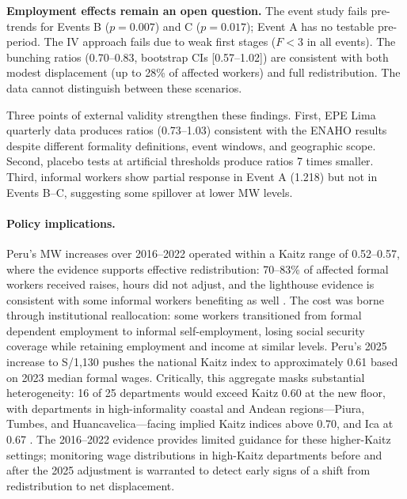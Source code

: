 \documentclass[12pt]{article}
\begin{document}
\textbf{Employment effects remain an open question.} The event study fails pre-trends for Events B ($p = 0.007$) and C ($p = 0.017$); Event A has no testable pre-period. The IV approach fails due to weak first stages ($F < 3$ in all events). The bunching ratios (0.70--0.83, bootstrap CIs [0.57--1.02]) are consistent with both modest displacement (up to 28\% of affected workers) and full redistribution. The data cannot distinguish between these scenarios.

Three points of external validity strengthen these findings. First, EPE Lima quarterly data produces ratios (0.73--1.03) consistent with the ENAHO results despite different formality definitions, event windows, and geographic scope. Second, placebo tests at artificial thresholds produce ratios 7 times smaller. Third, informal workers show partial response in Event A (1.218) but not in Events B--C, suggesting some spillover at lower MW levels.

\paragraph{Policy implications.} Peru's MW increases over 2016--2022 operated within a Kaitz range of 0.52--0.57, where the evidence supports effective redistribution: 70--83\% of affected formal workers received raises, hours did not adjust, and the lighthouse evidence is consistent with some informal workers benefiting as well \citep{belman2014, manning2021}. The cost was borne through institutional reallocation: some workers transitioned from formal dependent employment to informal self-employment, losing social security coverage while retaining employment and income at similar levels. Peru's 2025 increase to S/1,130 pushes the national Kaitz index to approximately 0.61 based on 2023 median formal wages. Critically, this aggregate masks substantial heterogeneity: 16 of 25 departments would exceed Kaitz 0.60 at the new floor, with departments in high-informality coastal and Andean regions---Piura, Tumbes, and Huancavelica---facing implied Kaitz indices above 0.70, and Ica at 0.67 \citep{manning2021}. The 2016--2022 evidence provides limited guidance for these higher-Kaitz settings; monitoring wage distributions in high-Kaitz departments before and after the 2025 adjustment is warranted to detect early signs of a shift from redistribution to net displacement.
\end{document}
